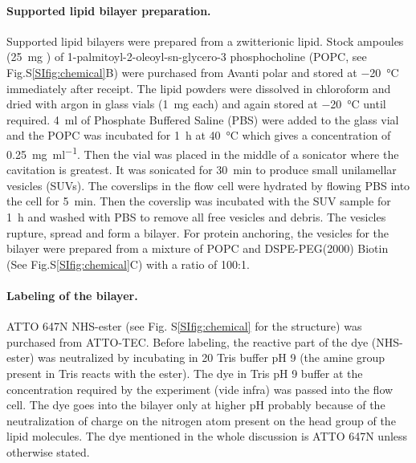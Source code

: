 \paragraph*{Supported lipid bilayer preparation.}
Supported lipid bilayers were prepared from a zwitterionic lipid.
Stock ampoules (\SI{25}{\mg} ) of 1-palmitoyl-2-oleoyl-sn-glycero-3 phosphocholine (POPC, see Fig.S\ref{SIfig:chemical}B) were purchased from Avanti polar and stored at \SI{-20}{\celsius} immediately after receipt.
The lipid powders were dissolved in chloroform and dried with argon in glass vials (\SI{1}{\mg} each) and again stored at \SI{-20}{\celsius} until required.
\SI{4}{\ml} of Phosphate Buffered Saline (PBS) were added to the glass vial and the POPC was incubated for \SI{1}{\hour} at \SI{40}{\celsius} which gives a concentration of \SI[per-mode=symbol]{0.25}{\mg \per\ml}.
Then the vial was placed in the middle of a sonicator where the cavitation is greatest.
It was sonicated for \SI{30}{\minute} to produce small unilamellar vesicles (SUVs). 
The coverslips in the flow cell were hydrated by flowing PBS into the cell for \SI{5}{\minute}.
Then the coverslip was incubated with the SUV sample for \SI{1}{\hour} and washed with PBS to remove all free vesicles and debris.
The vesicles rupture, spread and form a bilayer.\cite{richter2006formation}
For protein anchoring, the vesicles for the bilayer were prepared from a mixture of POPC and DSPE-PEG(2000) Biotin (See Fig.S\ref{SIfig:chemical}C) with a ratio of 100:1.


\paragraph*{Labeling of the bilayer.}
ATTO 647N NHS-ester (see Fig. S\ref{SIfig:chemical} for the structure) was purchased from ATTO-TEC.
Before labeling, the reactive part of the dye (NHS-ester) was neutralized by incubating in \SI{20}{\mM} Tris buffer pH 9 (the amine group present in Tris reacts with the ester).
The dye in Tris pH 9 buffer at the concentration required by the experiment (vide infra) was passed into the flow cell.
The dye goes into the bilayer only at higher pH probably because of the neutralization of charge on the nitrogen atom present on the head group of the lipid molecules. 
The dye mentioned in the whole discussion is ATTO 647N unless otherwise stated.


